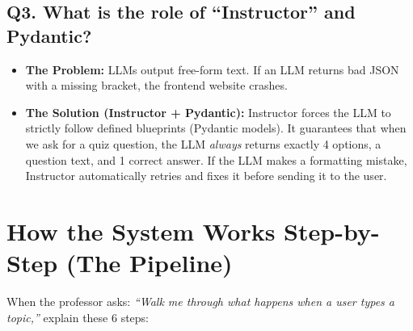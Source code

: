 \documentclass[11pt,a4paper]{article}
\begin{document}
\subsection*{Q3. What is the role of ``Instructor'' and Pydantic?}
\begin{answerbox}
\begin{itemize}[noitemsep]
    \item \textbf{The Problem:} LLMs output free-form text. If an LLM returns bad JSON with a missing bracket, the frontend website crashes.
    \item \textbf{The Solution (Instructor + Pydantic):} Instructor forces the LLM to strictly follow defined blueprints (Pydantic models). It guarantees that when we ask for a quiz question, the LLM \textit{always} returns exactly 4 options, a question text, and 1 correct answer. If the LLM makes a formatting mistake, Instructor automatically retries and fixes it before sending it to the user.
\end{itemize}
\end{answerbox}

\section{How the System Works Step-by-Step (The Pipeline)}

When the professor asks: \textit{``Walk me through what happens when a user types a topic,''} explain these 6 steps:
\end{document}
